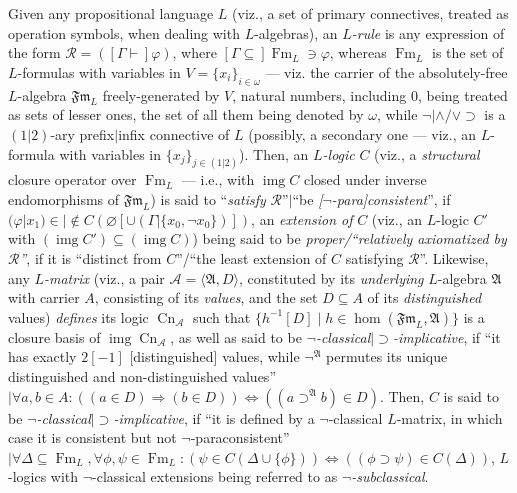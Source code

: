 \documentclass[bsl,meeting]{asl}
\newcommand{\NP}{}
\newcommand{\mf}[1]{\mathfrak{#1}}
\newcommand{\mc}[1]{\mathcal{#1}}
\newcommand{\ms}[1]{\mathscr{#1}}
\newcommand{\couple}[2]{\langle{#1},{#2}\rangle}
\newcommand{\FA}{\mf{Fm}}
\newcommand{\inverse}[1]{{#1}^{-1}}
\def\iff{\Leftrightarrow}
\DeclareMathOperator{\Fm}{Fm}
\DeclareMathOperator{\img}{img}
\DeclareMathOperator{\Cn}{Cn}
\begin{document}
\thispagestyle{empty}


\NP
{}



Given any propositional language $L$
(viz., a set of primary connectives,
treated as operation symbols, when dealing
with $L$-algebras), an {\em $L$-rule\/}
is any expression of the form $\ms{R}=([\Gamma\vdash]\varphi)$,
where $[\Gamma\subseteq]\Fm_L\ni\varphi$,
whereas $\Fm_L$ is the set of $L$-formulas
with variables in %
$V=\{x_i\}_{i\in\omega}$ --- viz.
the carrier of the absolutely-free $L$-algebra $\FA_L$
freely-generated by $V$,
natural numbers, including $0$,
being treated as sets of lesser ones,
the set of all them being denoted by $\omega$,
while $\neg|\land/\lor\supset$ is a
$(1|2)$-ary prefix$|$infix connective of $L$
(possibly, a secondary one --- viz., an $L$-formula
with variables in $\{x_j\}_{j\in(1|2)}$).
Then, an {\em $L$-logic\/} $C$ (viz.,
a {\em structural\/} closure operator over $\Fm_L$
--- i.e., with $\img C$ closed under inverse
endomorphisms of $\FA_L$)
is said to ``{\em satisfy\/} $\ms{R}$''$|$``be {\em [$\neg$-para]consistent\/}'',
if $(\varphi|x_1)\in|\not\in C(\varnothing[\cup(\Gamma|\{x_0,\neg x_0\})])$,
an {\em extension of\/} $C$ (viz., an $L$-logic $C'$ with $(\img C')\subseteq(\img
C)$)
being said to be {\em proper/``relatively axiomatized
by\/ $\ms{R}$''}, if it is ``distinct from $C$''/``the least
extension of $C$ satisfying $\ms{R}$''.
Likewise, any {\em $L$-matrix\/}
(viz., a pair $\mc{A}=\couple{\mf{A}}{D}$,
constituted by its {\em underlying\/} $L$-algebra $\mf{A}$ with
carrier $A$, consisting of its {\em values}, and the set $D\subseteq A$  of
its {\em distinguished\/} values) {\em defines\/} its logic
$\Cn_\mc{A}$ such that
$\{\inverse{h}[D]\mid h\in\hom(\FA_L,\mf{A})\}$
is a closure basis of %
$\img\Cn_\mc{A}$, %
as well as said to be {\em
$\neg$-classical\/$|\supset$-implicative},
if ``it has exactly $2[-1]$ [distinguished] values,
while $\neg^\mf{A}$ permutes its unique distinguished
and non-distinguished values''$|\forall a,b\in A:
((a\in D)\Rightarrow(b\in
D))\iff((a\supset^\mf{A}b)\in D)$.
Then, $C$ is said to be {\em $\neg$-classical\/$|\supset$-implicative},
if ``it %
is defined by
a $\neg$-classical $L$-matrix,
in which case it is consistent but not $\neg$-paraconsistent''$|\forall\Delta\subseteq\Fm_L,\forall\phi,\psi\in\Fm_L:
(\psi\in C(\Delta\cup\{\phi\}))\iff((\phi\supset\psi)\in
C(\Delta))$,
$L$-logics with $\neg$-classical extensions being referred to as
{\em $\neg$-subclassical}.
\end{document}
